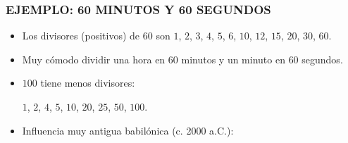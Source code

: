 \begin{frame}
  \frametitle{EJEMPLO: 60 MINUTOS Y 60 SEGUNDOS}

  \begin{minipage}[t][0.6\textheight]{0.6\textwidth}
    \vspace{0pt}
    \begin{itemize}
    \item<2-> Los divisores (positivos) de $60$ son
      $1$, $2$, $3$, $4$, $5$, $6$, $10$, $12$, $15$, $20$, $30$, $60$.

    \item<3-> Muy cómodo dividir una hora en $60$ minutos y un minuto en $60$
      segundos.

    \item<4-> $100$ tiene menos divisores:

      $1$, $2$, $4$, $5$, $10$, $20$, $25$, $50$, $100$.

    \item<5-> Influencia muy antigua babilónica (c. 2000 a.C.):


\end{itemize}
\end{minipage}
\end{frame}
